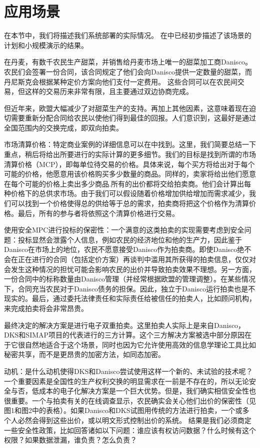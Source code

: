 \section{应用场景}
在本节中，我们将描述我们系统部署的实际情况。 在中已经初步描述了该场景的计划和小规模演示的结果。

在丹麦，有数千农民生产甜菜，并销售给丹麦市场上唯一的甜菜加工商Danisco。农民们会签署一份合同，该合同规定了他们会向Danisco提供一定数量的甜菜，而丹尼斯克会根据某种定价方案向他们支付一定费用。 这些合同可以在农民间交易，但这样的交易历来非常有限，且主要通过双边协商完成。

但近年来，欧盟大幅减少了对甜菜生产的支持。再加上其他因素，这意味着现在迫切需要重新分配合同给农民以使他们得到最佳的回报。人们意识到，这最好是通过全国范围内的交换完成，即双向拍卖。

{\heiti 市场清算价格}：特定商业案例的详细信息可以在中找到。这里，我们简要总结一下重点，稍后将给出所要进行的实际计算的更多细节。我们的目标是找到所谓的市场清算价格（MCP），即每单位待交易的价格。具体来说，每个买方将给出对于每个可能的价格，他愿意用该价格购买多少数量的商品。同样的，卖家将给出他们愿意在每个可能的价格上卖出多少商品.所有的出价都将交给拍卖商。他们会计算出每种价格下的总供求市场。由于我们可以假设随着价格增加供给增加而需求减少，我们可以找到一个价格使得总的供给等于总的需求，拍卖商将把这个价格作为清算价格。最后，所有的参与者将依照这个清算价格进行交易。

{\heiti 使用安全MPC进行投标的保密性}：一个满意的这类拍卖的实现需要考虑到安全问题：投标显然会泄露个人信息，例如农民的经济地位和他的生产力，因此鉴于Danisco在市场上的地位，农民不愿意接受Danisco作为拍卖商。即使Danisco绝不会在正在进行的合同（包括定价方案）再谈判中滥用其所获得的拍卖信息，仅仅对会发生这种情况的担忧可能会影响农民的出价并导致拍卖效果不理想。另一方面，一份合同中的标称数量由Danisco管理（并经常根据欧盟的管理调整）。在某些情况下，合同充当农民对于Danisco债务的担保。因此，独立于Danisco运行拍卖也是不现实的。最后，通过委托法律责任和实际责任给被信任的拍卖人，比如顾问机构，来完成拍卖将会非常昂贵。

最终决定的解决方案是进行电子双重拍卖。这里拍卖人实际上是来自Danisco，DKS和SIMAP项目的代表进行的三方计算。这个三方解决方案被选中部分原因在于它很自然地适合于这个场景，同时也因为它允许使用高效的信息学理论工具比如秘密共享，而不是更昂贵的加密方法，如同态加密。

{\heiti 动机}：是什么动机使得DKS和Danisco尝试使用这样一个新的、未试验的技术呢？一个重要因素是全国性的生产权利交换的明显需求在一前是不存在的，所以无论安全与否，低成本的电子化解决方案是一个巨大优势。但是，我们确实相信安全性也很重要。一个与拍卖有关的在线调查显示，农民确实会关心他们出价的保密性（见图1和图2中的表格）。如果Danisco和DKS试图用传统的方法进行拍卖，一个或多个人必然会得到这些出价，或以明文形式控制出价的系统。 结果是我们必须商定一些安全性政策，比如回答诸如以下问题：谁应该有权访问数据？什么时候有这个权限？如果数据泄漏，谁负责？怎么负责？

